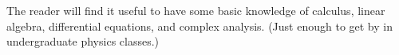 \documentclass[12pt]{book}
\theoremstyle{definition}
\begin{document}
The reader will find it useful to have some basic knowledge
of calculus, linear algebra, differential equations, and complex analysis.
(Just enough to get by in undergraduate physics classes.) 

\tableofcontents                        %
\mainmatter                             %


%


%







\begin{appendices}







\end{appendices}

\printindex
\end{document}
